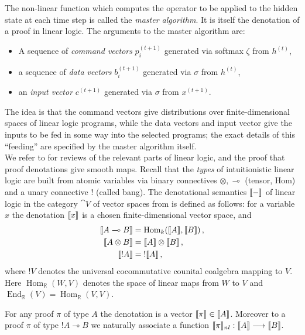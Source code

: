 \documentclass[english,letter paper,12pt,leqno]{article}
\theoremstyle{example}
\numberwithin{equation}{section}
\def\Hom{\operatorname{Hom}}
\DeclareMathOperator{\End}{End}
\begin{document}
The non-linear function which computes the operator to be applied to the hidden state at each time step is called the \emph{master algorithm}. It is itself the denotation of a proof in linear logic. The arguments to the master algorithm are:
\begin{itemize}
\item A sequence of \emph{command vectors} $p_i^{(t+1)}$ generated via softmax $\zeta$ from $h^{(t)}$,
\item a sequence of \emph{data vectors} $b_i^{(t+1)}$ generated via $\sigma$ from $h^{(t)}$,
\item an \emph{input vector} $c^{(t+1)}$ generated via $\sigma$ from $x^{(t+1)}$.
\end{itemize}
The idea is that the command vectors give distributions over finite-dimensional spaces of linear logic programs, while the data vectors and input vector give the inputs to be fed in some way into the selected programs; the exact details of this ``feeding'' are specified by the master algorithm itself.
\\

We refer to \cite{murfet_ll,murfetclift} for reviews of the relevant parts of linear logic, and the proof that proof denotations give smooth maps. Recall that the \emph{types} of intuitionistic linear logic are built from atomic variables via binary connectives $\otimes, \multimap$ (tensor, Hom) and a unary connective ${!}$ (called bang). The denotational semantics $\llbracket - \rrbracket$ of linear logic in the category $\cat{V}$ of vector spaces from \cite[\S 5.1, \S 5.3]{murfet_ll} is defined as follows: for a variable $x$ the denotation $\llbracket x \rrbracket$ is a chosen finite-dimensional vector space, and
\begin{align*}
\den{A \multimap B} &= \Hom_k(\den{A},\den{B})\,,\\
\den{A \otimes B} &= \den{A} \otimes \den{B}\,,\\
\den{{!}A} &= {!} \den{A}\,,
\end{align*}
where ${!} V$ denotes the universal cocommutative counital coalgebra mapping to $V$. Here $\Hom_{\mathbb{R}}(W,V)$ denotes the space of linear maps from $W$ to $V$ and $\End_{\mathbb{R}}(V) = \Hom_{\mathbb{R}}(V,V)$.

For any proof $\pi$ of type $A$ the denotation is a vector $\llbracket \pi \rrbracket \in \llbracket A \rrbracket$. Moreover to a proof $\pi$ of type ${!} A \multimap B$ we naturally associate \cite[Definition 5.10]{murfet_ll} a function $\llbracket \pi \rrbracket_{nl}: \llbracket A \rrbracket \longrightarrow \llbracket B \rrbracket$.
\end{document}
